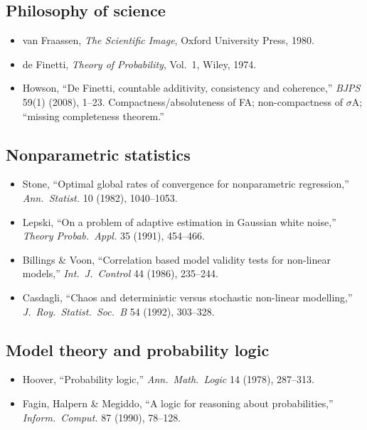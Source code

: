 \subsection*{Philosophy of science}
\begin{itemize}
  \item van Fraassen, \emph{The Scientific Image}, Oxford University Press, 1980.~\cite{vanFraassen1980}
  \item de Finetti, \emph{Theory of Probability}, Vol.~1, Wiley, 1974.~\cite{deFinetti1974}
  \item Howson, ``De Finetti, countable additivity, consistency and coherence,'' \emph{BJPS} 59(1) (2008), 1--23.  Compactness/absoluteness of FA; non-compactness of $\sigma$A; ``missing completeness theorem.''~\cite{Howson2008}
\end{itemize}

\subsection*{Nonparametric statistics}
\begin{itemize}
  \item Stone, ``Optimal global rates of convergence for nonparametric regression,'' \emph{Ann.\ Statist.} 10 (1982), 1040--1053.~\cite{Stone1982}
  \item Lepski, ``On a problem of adaptive estimation in Gaussian white noise,'' \emph{Theory Probab.\ Appl.} 35 (1991), 454--466.~\cite{Lepski1991}
  \item Billings \& Voon, ``Correlation based model validity tests for non-linear models,'' \emph{Int.\ J.\ Control} 44 (1986), 235--244.~\cite{BillingsVoon1986}
  \item Casdagli, ``Chaos and deterministic versus stochastic non-linear modelling,'' \emph{J.\ Roy.\ Statist.\ Soc.\ B} 54 (1992), 303--328.~\cite{Casdagli1992}
\end{itemize}

\subsection*{Model theory and probability logic}
\begin{itemize}
  \item Hoover, ``Probability logic,'' \emph{Ann.\ Math.\ Logic} 14 (1978), 287--313.~\cite{Hoover1978}
  \item Fagin, Halpern \& Megiddo, ``A logic for reasoning about probabilities,'' \emph{Inform.\ Comput.} 87 (1990), 78--128.~\cite{FaginHalpernMegiddo1990}
\end{itemize}
